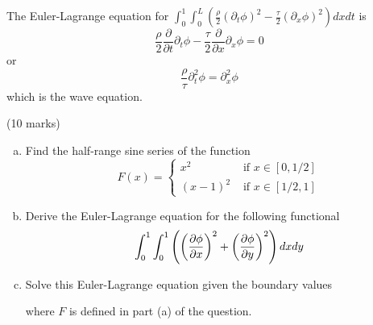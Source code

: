 \documentclass[12pt]{article}
\begin{document}
\begin{answer}
The Euler-Lagrange equation for $\int_0^1\int_0^L(\frac{\rho}{2}(\partial_t\phi)^2-\frac{\tau}{2}(\partial_x\phi)^2)dxdt$ is
\[\frac{\rho}{2}\frac{\partial}{\partial t}\partial_t\phi-\frac{\tau}{2}\frac{\partial}{\partial x}\partial_x\phi=0\]
or
\[\frac{\rho}{\tau}\partial_t^2\phi=\partial_x^2\phi\]
which is the wave equation.
\end{answer}

\newpage

\begin{question}(10 marks)\\
\begin{enumerate}[(a)]
\item Find the half-range sine series of the function
\[F(x)=\begin{cases}
x^2&\mbox{ if }x\in[0,1/2]\\
(x-1)^2&\mbox{ if }x\in[1/2,1]
\end{cases}\]

\item Derive the Euler-Lagrange equation for the following functional
\[\int_0^1\int_0^1\left(\left(\dfrac{\partial \phi}{\partial x}\right)^2+\left(\dfrac{\partial \phi}{\partial y}\right)^2\right)dxdy\]

\item Solve this Euler-Lagrange equation given the boundary values

\begin{center}
\end{center}
where $F$ is defined in part (a) of the question.
\end{enumerate}
\end{question}
\end{document}
